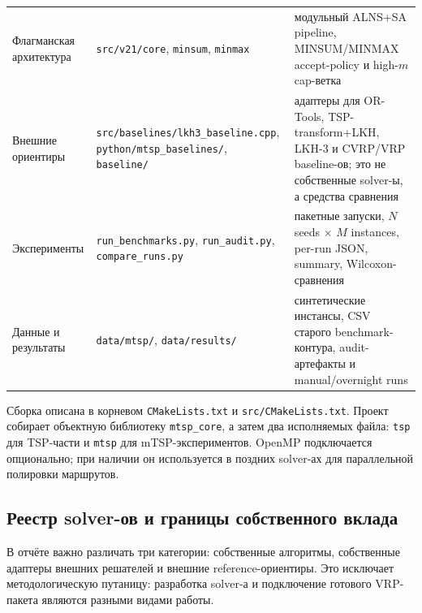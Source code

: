 \documentclass[14pt,a4paper]{extarticle}
\begin{document}
{\begin{longtable}{>{\raggedright\arraybackslash}p{}>{\raggedright\arraybackslash}p{}>{\raggedright\arraybackslash}p{}}
Флагманская архитектура & \texttt{src/v21/core}, \texttt{minsum}, \texttt{minmax} & модульный ALNS+SA pipeline, MINSUM/MINMAX accept-policy и high-$m$ cap-ветка\\
Внешние ориентиры & \texttt{src/baselines/lkh3\_baseline.cpp}, \texttt{python/mtsp\_baselines/}, \texttt{baseline/} & адаптеры для OR-Tools, TSP-transform+LKH, LKH-3 и CVRP/VRP baseline-ов; это не собственные solver-ы, а средства сравнения\\
Эксперименты & \texttt{run\_benchmarks.py}, \texttt{run\_audit.py}, \texttt{compare\_runs.py} & пакетные запуски, $N$ seeds $\times$ $M$ instances, per-run JSON, summary, Wilcoxon-сравнения\\
Данные и результаты & \texttt{data/mtsp/}, \texttt{data/results/} & синтетические инстансы, CSV старого benchmark-контура, audit-артефакты и manual/overnight runs\\
\bottomrule
\end{longtable}
}

Сборка описана в корневом \texttt{CMakeLists.txt} и \texttt{src/CMakeLists.txt}. Проект собирает объектную библиотеку \texttt{mtsp\_core}, а затем два исполняемых файла: \texttt{tsp} для TSP-части и \texttt{mtsp} для mTSP-экспериментов. OpenMP подключается опционально; при наличии он используется в поздних solver-ах для параллельной полировки маршрутов.

\subsection{Реестр solver-ов и границы собственного вклада}

В отчёте важно различать три категории: собственные алгоритмы, собственные адаптеры внешних решателей и внешние reference-ориентиры. Это исключает методологическую путаницу: разработка solver-а и подключение готового VRP-пакета являются разными видами работы.
\end{document}
